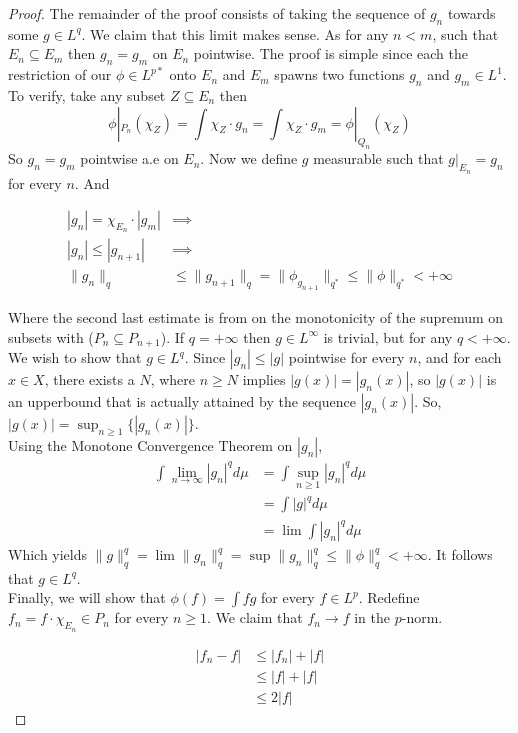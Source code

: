 \documentclass[../../main.tex]{subfiles}
\begin{document}
\begin{proof}
The remainder of the proof consists of taking the sequence of $g_n$ towards some $g\in L^q$. We claim that this limit makes sense. As for any $n<m$, such that $E_n\subseteq E_m$ then $g_n = g_m$ on $E_n$ pointwise. The proof is simple since each the restriction of our $\phi\in L^{p*}$ onto $E_n$ and $E_m$ spawns two functions $g_n$ and $g_m\in L^1$. To verify, take any subset $Z\subseteq E_n$ then
\[
\phi|_{P_n}(\chi_Z) = \int \chi_Z\cdot g_n = \int \chi_Z\cdot g_m = \phi|_{Q_n}(\chi_Z)
\]
So $g_n = g_m$ pointwise a.e on $E_n$. Now we define $g$ measurable such that $g|_{E_n} = g_n$ for every $n$. And

\begin{align*}
    |g_n| = \chi_{E_n}\cdot |g_m|&\implies \\
    |g_n| \leq |g_{n+1}|&\implies \\
    \lVert g_n \rVert_q
    &\leq\lVert g_{n+1} \rVert_q = \lVert \phi_{g_{n+1}} \rVert_{q^*}
    \leq \lVert \phi \rVert_{q^*}
    < +\infty
\end{align*}



Where the second last estimate is from on the monotonicity of the supremum on subsets with ($P_n\subseteq P_{n+1}$). If $q = +\infty$ then $g\in L^\infty$ is trivial, but for any $q<+\infty$. We wish to show that $g\in L^q$. Since $|g_n|\leq |g|$ pointwise for every $n$, and for each $x\in X$, there exists a $N$, where $n\geq N$ implies $|g(x)| = |g_n(x)|$, so $|g(x)|$ is an upperbound that is actually attained by the sequence $|g_n(x)|$. So, $|g(x)| = \sup_{n\geq 1}\{|g_n(x)|\}$. \\

Using the Monotone Convergence Theorem on $|g_n|$, 
\begin{align*}
    \int \lim_{n\to\infty} |g_n|^q d\mu &= \int\sup_{n\geq 1}|g_n|^q d\mu\\
    &= \int |g|^qd\mu\\
    &= \lim \int |g_n|^q d\mu
\end{align*}
Which yields $\lVert g \rVert^q_q = \lim \lVert g_n \rVert^q_q = \sup \lVert g_n \rVert^q_q \leq \lVert \phi \rVert^q_q < +\infty$. It follows that $g\in L^q$.\\

Finally, we will show that $\phi(f) = \int fg$ for every $f\in L^p$. Redefine $f_n = f\cdot\chi_{E_n} \in P_n$ for every $n\geq 1$. We claim that $f_n \to f$ in the $p$-norm.


\begin{align*}
    |f_n - f| &\leq |f_n| + |f|\\
    &\leq |f| + |f|\\
    &\leq 2|f|
\end{align*}


\end{proof}
\end{document}
